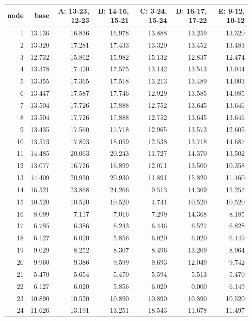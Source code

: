 \begin{tabular}{rrrrrrr}
\toprule
node & base & A: 13-23, 12-23 & B: 14-16, 15-21 & C: 3-24, 15-24 & D: 16-17, 17-22 & E: 9-12, 10-12 \\
\midrule
1 & 13.136 & 16.836 & 16.978 & 13.888 & 13.259 & 13.320 \\
2 & 13.320 & 17.281 & 17.433 & 13.320 & 13.452 & 13.483 \\
3 & 12.732 & 15.862 & 15.982 & 15.132 & 12.837 & 12.474 \\
4 & 13.378 & 17.420 & 17.575 & 13.142 & 13.513 & 13.044 \\
5 & 13.355 & 17.365 & 17.518 & 13.213 & 13.489 & 14.003 \\
6 & 13.447 & 17.587 & 17.746 & 12.929 & 13.585 & 14.085 \\
7 & 13.504 & 17.726 & 17.888 & 12.752 & 13.645 & 13.646 \\
8 & 13.504 & 17.726 & 17.888 & 12.752 & 13.645 & 13.646 \\
9 & 13.435 & 17.560 & 17.718 & 12.965 & 13.573 & 12.605 \\
10 & 13.573 & 17.893 & 18.059 & 12.538 & 13.718 & 14.687 \\
11 & 14.485 & 20.063 & 20.243 & 11.727 & 14.370 & 13.502 \\
12 & 13.077 & 16.726 & 16.899 & 12.071 & 13.500 & 10.358 \\
13 & 14.409 & 20.930 & 20.930 & 11.891 & 15.820 & 11.460 \\
14 & 16.521 & 23.868 & 24.266 & 9.513 & 14.369 & 15.257 \\
15 & 10.520 & 10.520 & 10.520 & 4.741 & 10.520 & 10.520 \\
16 & 8.099 & 7.117 & 7.016 & 7.299 & 14.368 & 8.185 \\
17 & 6.785 & 6.386 & 6.243 & 6.446 & 6.527 & 6.828 \\
18 & 6.127 & 6.020 & 5.856 & 6.020 & 6.020 & 6.149 \\
19 & 9.029 & 8.252 & 8.307 & 8.496 & 13.209 & 8.964 \\
20 & 9.960 & 9.386 & 9.599 & 9.693 & 12.049 & 9.742 \\
21 & 5.470 & 5.654 & 5.470 & 5.594 & 5.513 & 5.470 \\
22 & 6.127 & 6.020 & 5.856 & 6.020 & 0.000 & 6.149 \\
23 & 10.890 & 10.520 & 10.890 & 10.890 & 10.890 & 10.520 \\
24 & 11.626 & 13.191 & 13.251 & 18.543 & 11.678 & 11.497 \\
\bottomrule
\end{tabular}

